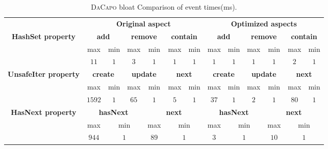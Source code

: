 \begin{table*}[t]
\centering
\scriptsize
\begin{tabular}{|c|c|c|c|c|c|c||c|c|c|c|c|c|}
\hline
\multirow{1}{*}{}                                                                
     & \multicolumn{6}{c||}{\bf Original aspect} & 
\multicolumn{6}{c|}{\bf Optimized aspects} \\ \cline{1-13} 
                                                                                 
 \multirow{3}{*}{\bf HashSet property}    & \multicolumn{2}{c|}{\bf add}  &
 \multicolumn{2}{c|}{\bf remove} & \multicolumn{2}{c||}{\bf contain} &
 \multicolumn{2}{c|}{\bf add}   &
 \multicolumn{2}{c|}{\bf remove} & \multicolumn{2}{c|}{\bf contain}         \\
 \cline{2-13} & max & min & max & min & max & min & max & min & max & min & max & min
 \\\cline{2-13}  
 &  $11$ & $1$   &   $3$     & $1$   &  $1$   & $1$   &   $1$    & $1$   &  $1$   
 & $1$ & $2$ & $1$\\\hline
 
  \multirow{3}{*}{\bf UnsafeIter property}    & \multicolumn{2}{c|}{\bf create} 
  & \multicolumn{2}{c|}{\bf update} & \multicolumn{2}{c||}{\bf next} &
 \multicolumn{2}{c|}{\bf create}   &
 \multicolumn{2}{c|}{\bf update} & \multicolumn{2}{c|}{\bf next}         \\
 \cline{2-13} & max & min & max & min & max & min & max & min & max & min & max & min
 \\\cline{2-13}  
 &  $1592$ & $1$   &   $65$     & $1$   &  $5$   & $1$   &   $37$    & $1$   & 
 $2$ & $1$ & $80$ & $1$\\\hline
 
   \multirow{3}{*}{\bf HasNext property}    & \multicolumn{3}{c|}{\bf hasNext} 
   & \multicolumn{3}{c||}{\bf next} &
 \multicolumn{3}{c|}{\bf hasNext}   & \multicolumn{3}{c|}{\bf next} \\
 \cline{2-13}
 
 & \multicolumn{1}{c|}{max} & \multicolumn{2}{c|}{min} &  
 \multicolumn{1}{c|}{max} & \multicolumn{2}{c||}{min} &
 \multicolumn{1}{c|}{max} & \multicolumn{2}{c|}{min} &
 \multicolumn{1}{c|}{max} & \multicolumn{2}{c|}{min}  \\\cline{2-13}  
 &   \multicolumn{1}{c|}{$944$} & \multicolumn{2}{c|}{$1$}   &  
 \multicolumn{1}{c|}{$89$} & \multicolumn{2}{c||}{$1$} &  
 \multicolumn{1}{c|}{$3$}   & \multicolumn{2}{c|}{$1$}   & 
 \multicolumn{1}{c|}{$10$}   & \multicolumn{2}{c|}{$1$}   \\\hline
 
 

\end{tabular}
\caption{\textsc{DaCapo} bloat Comparison of event times(ms).}
\end{table*}
\label{table:eventTime}


